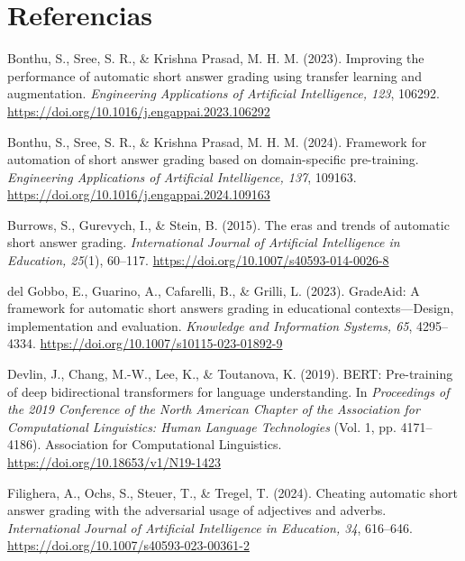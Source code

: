 \documentclass[11pt,oneside,openany]{book}
\begin{document}
\backmatter
\chapter*{Referencias}

\small
\begin{list}{}{%
  \setlength{\leftmargin}{1.27cm}%
  \setlength{\itemindent}{-1.27cm}%
  \setlength{\itemsep}{0.9em}}

\item Bonthu, S., Sree, S. R., \& Krishna Prasad, M. H. M. (2023). Improving the
performance of automatic short answer grading using transfer learning and
augmentation. \emph{Engineering Applications of Artificial Intelligence, 123},
106292. \url{https://doi.org/10.1016/j.engappai.2023.106292}

\item Bonthu, S., Sree, S. R., \& Krishna Prasad, M. H. M. (2024). Framework for
automation of short answer grading based on domain-specific pre-training.
\emph{Engineering Applications of Artificial Intelligence, 137}, 109163.
\url{https://doi.org/10.1016/j.engappai.2024.109163}

\item Burrows, S., Gurevych, I., \& Stein, B. (2015). The eras and trends of
automatic short answer grading. \emph{International Journal of Artificial
Intelligence in Education, 25}(1), 60--117.
\url{https://doi.org/10.1007/s40593-014-0026-8}

\item del Gobbo, E., Guarino, A., Cafarelli, B., \& Grilli, L. (2023). GradeAid: A
framework for automatic short answers grading in educational contexts---Design,
implementation and evaluation. \emph{Knowledge and Information Systems, 65},
4295--4334. \url{https://doi.org/10.1007/s10115-023-01892-9}

\item Devlin, J., Chang, M.-W., Lee, K., \& Toutanova, K. (2019). BERT:
Pre-training of deep bidirectional transformers for language understanding. In
\emph{Proceedings of the 2019 Conference of the North American Chapter of the
Association for Computational Linguistics: Human Language Technologies} (Vol. 1,
pp. 4171--4186). Association for Computational Linguistics.
\url{https://doi.org/10.18653/v1/N19-1423}

\item Filighera, A., Ochs, S., Steuer, T., \& Tregel, T. (2024). Cheating automatic
short answer grading with the adversarial usage of adjectives and adverbs.
\emph{International Journal of Artificial Intelligence in Education, 34},
616--646. \url{https://doi.org/10.1007/s40593-023-00361-2}


\end{list}
\end{document}
